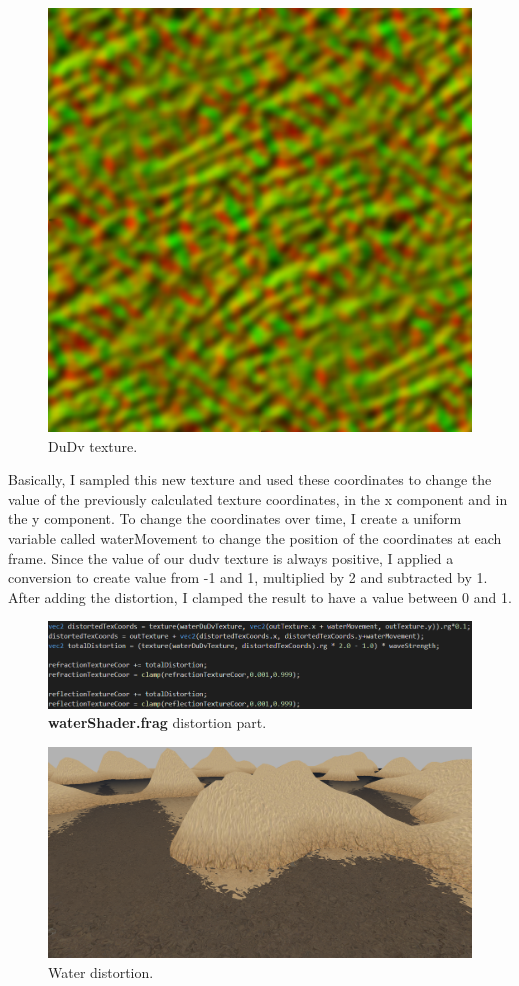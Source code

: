 \begin{figure}[hbt!]
	\centering
	\includegraphics[width= 0.5
	\textwidth]{../textures/plane/waterDUDV.png}
	\caption{DuDv texture.}
\end{figure} 

\noindent
Basically, I sampled this new texture and used these coordinates to change the value of the previously calculated texture coordinates, in the x component and in the y component. To change the coordinates over time, I create a uniform variable called waterMovement to change the position of the coordinates at each frame. Since the value of our dudv texture is always positive, I applied a conversion to create value from -1 and 1, multiplied by 2 and subtracted by 1. After adding the distortion, I clamped the result to have a value between 0 and 1.

\begin{figure}[hbt!]
	\centering
	\includegraphics[width= 1
	\textwidth]{images/TextDist.png}
	\caption{\textbf{waterShader.frag} distortion part.}
	\label{fig::distortion}
\end{figure}

\begin{figure}[hbt!]
	\centering
	\includegraphics[width= 1
	\textwidth]{images/Water4.png}
	\caption{Water distortion.}
\end{figure}

